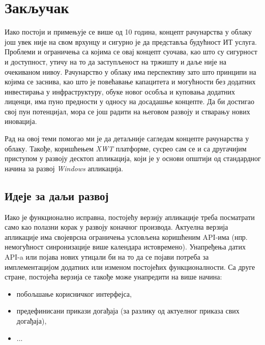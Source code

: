 \chapter{Закључак}

Иако постоји и примењује се више од 10 година, концепт рачунарства у облаку још увек није на свом врхунцу и сигурно је да представља будућност ИТ услуга. Проблеми и ограничења са којима се овај концепт суочава, као што су сигурност и  доступност, утичу на то да заступљеност на тржишту и даље није на очекиваном нивоу. Рачунарство у облаку има перспективу зато што принципи на којима се заснива, као што је повећавање капацитета и могућности без додатних инвестирања у инфраструктуру, обуке новог особља и куповања додатних лиценци, има пуно предности у односу на досадашње концепте. Да би достигао свој пун потенцијал, мора се још радити на његовом развоју и стварању нових иновација.

Рад на овој теми помогао ми је да детаљније сагледам концепте рачунарства у облаку. Такође, коришћењем \textit{XWT} платформе, сусрео сам се и са другачијим приступом у развоју десктоп апликација, који је у основи општији од стандардног начина за развој \textit{Windows} апликација.

\section{Идеје за даљи развој}

Иако је функционално исправна, постојећу верзију апликације треба посматрати само као полазни корак у развоју коначног производа. Актуелна верзија апликације има својеврсна ограничења условљена коришћеним API-има (нпр. немогућност синронизације више календара истовремено). Унапређења датих API-a или појава нових утицали би на то да се појави потреба за имплементацијом додатних или изменом постојећих функционалности. Са друге стране, постојећа верзија се такође може унапредити на више начина:
\begin{itemize}
	\item{побољшање корисничког интерфејса},
	\item{предефинисани прикази догађаја (за разлику од актуелног приказа свих догађаја)},
	\item{...}
\end{itemize}